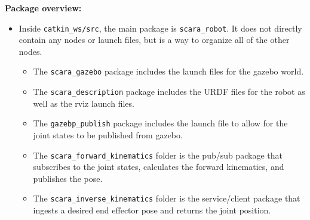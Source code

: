 \documentclass[10pt]{article}
\begin{document}
\setlength{\abovedisplayskip}{6pt}
\setlength{\belowdisplayskip}{3pt}
\setlength{\abovedisplayshortskip}{4pt}
\setlength{\belowdisplayshortskip}{4pt}

\textbf{Package overview:}
\begin{itemize}
	\item Inside \texttt{catkin\_ws/src}, the main package is \texttt{scara\_robot}. It does not directly contain any nodes or launch files, but is a way to organize all of the other nodes.
	\begin{itemize}
		\item The \texttt{scara\_gazebo} package includes the launch files for the gazebo world.
		\item The \texttt{scara\_description} package includes the URDF files for the robot as well as the rviz launch files.
		\item The \texttt{gazebp\_publish} package includes the launch file to allow for the joint states to be published from gazebo.
		\item The \texttt{scara\_forward\_kinematics} folder is the pub/sub package that subscribes to the joint states, calculates the forward kinematics, and publishes the pose.
		\item The \texttt{scara\_inverse\_kinematics} folder is the service/client package that ingests a desired end effector pose and returns the joint position.
	\end{itemize}
\end{itemize}
\end{document}
